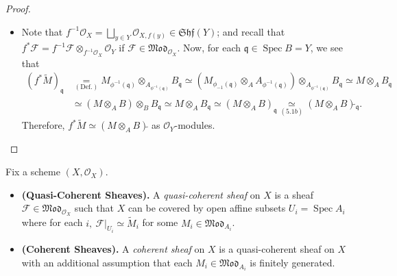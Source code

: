 \documentclass[11pt,a4paper,footinclude=true,headinclude=true]{scrbook} %
\DeclareMathOperator{\Spec}{Spec}
\newcommand{\FF}{\mathscr{F}}
\newcommand{\OO}{\mathcal{O}}
\newcommand{\qq}{\mathfrak{q}}
\newcommand{\Shf}{\mathfrak{Shf}}
\newcommand{\<}{\langle}
\newcommand{\>}{\rangle}
\newcommand{\MOD}{\mathfrak{Mod}}
\newenvironment{definition*}[2][Definition]
    { \begin{mdframed}[backgroundcolor=blue!20] \textbf{#1.}\ }
    {  \end{mdframed}}
\begin{document}
\begin{proof}
\begin{itemize}
        \item[(e)] Note that $f^{-1}\OO_X=\bigsqcup_{y\in Y}\OO_{X,f(y)}\in\Shf(Y)$; and recall that $f^\ast\FF=f^{-1}\FF\otimes_{f^{-1}\OO_X}\OO_Y$ if $\FF\in\MOD_{\OO_X}$. Now, for each $\qq\in\Spec B=Y$, we see that
        \begin{align*}
            (f^\ast\widetilde{M})_\qq &\underset{(\text{Def.})}{=}M_{\phi^{-1}(\qq)}\otimes_{A_{\phi^{-1}(\qq)}}B_\qq\simeq(M_{\phi_{-1}(\qq)}\otimes_AA_{\phi^{-1}(\qq)})\otimes_{A_{\phi^{-1}(\qq)}}B_\qq\simeq M\otimes_AB_\qq\\ &\simeq(M\otimes_AB)\otimes_BB_\qq\simeq M\otimes_AB_\qq\simeq(M\otimes_AB)_\qq\underset{(5.1b)}{\simeq}(M\otimes_AB)\widetilde{}_\qq.
        \end{align*}
        Therefore, $f^\ast\widetilde{M}\simeq(M\otimes_AB)\widetilde{}$ as $\OO_Y$-modules.
    \end{itemize}
\end{proof}

\begin{definition*}{}
    Fix a scheme $(X,\OO_X)$.
    \begin{itemize}
        \item \textbf{(Quasi-Coherent Sheaves).} A \textit{quasi-coherent sheaf} on $X$ is a sheaf $\FF\in\MOD_{\OO_X}$ such that $X$ can be covered by open affine subsets $U_i=\Spec A_i$ where for each $i,\ \FF|_{U_i}\simeq\widetilde{M}_i$ for some $M_i\in \MOD_{A_i}$.
        \item \textbf{(Coherent Sheaves).} A \textit{coherent sheaf} on $X$ is a quasi-coherent sheaf on $X$ with an additional assumption that each $M_i\in \MOD_{A_i}$ is finitely generated. 
    \end{itemize}
\end{definition*}
\end{document}

